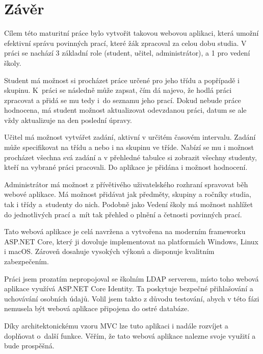 \documentclass[a4paper, 12pt]{report}
\begin{document}
	\chapter{Závěr}
	Cílem této maturitní práce bylo vytvořit takovou webovou aplikaci, která umožní efektivní správu povinných prací, které žák zpracoval za celou dobu studia. V práci se nachází 3 základní role (student, učitel, administrátor), a 1 pro vedení školy.\par
	Student má možnost si procházet práce určené pro jeho třídu a popřípadě i skupinu. K~práci se následně může zapsat, čím dá najevo, že hodlá práci zpracovat a přidá se mu tedy i~do seznamu jeho prací. Dokud nebude práce hodnocena, má student možnost aktualizovat odevzdanou práci, datum se ale vždy aktualizuje na den poslední úpravy.\par
	Učitel má možnost vytvářet zadání, aktivní v určitém časovém intervalu. Zadání může specifikovat na třídu a nebo i na skupinu ve tříde.	Nabízí se mu i možnost procházet všechna svá zadání a v přehledné tabulce si zobrazit všechny studenty, kteří na vybrané práci pracovali. Do aplikace je přidána i možnost hodnocení.\par
	Administrátor má možnost z přívětivého uživatelského rozhraní spravovat běh webové aplikace. Má možnost přidávat jak předměty, skupiny a ročníky studia, tak i třídy a~studenty do nich. Podobně jako Vedení školy má možnost nahlížet do jednotlivých prací a~mít tak přehled o plnění a četnosti povinných prací.\par
	Tato webová aplikace je celá navržena a vytvořena na moderním frameworku ASP.NET Core, který ji dovoluje implementovat na platformách Windows, Linux i macOS. Zároveň dosahuje vysokých výkonů a disponuje kvalitním zabezpečením.\par
	Práci jsem prozatím nepropojoval se školním LDAP serverem, místo toho webová aplikace využívá ASP.NET Core Identity. Ta poskytuje bezpečné přihlašování a uchovávání osobních údajů. Volil jsem takto z důvodu testování, abych v této fázi nemusela být webová aplikace připojena do ostré databáze.\par
	Díky architektonickému vzoru MVC lze tuto aplikaci i nadále rozvíjet a doplňovat o~další funkce. Věřím, že tato webová aplikace nalezne svoje využití a bude prospěšná.

	\seznamObrazku

	\renewcommand\listoflistingscaption{Seznam zdrojových kódů}
	\listoflistings
	

	
	

\end{document}
